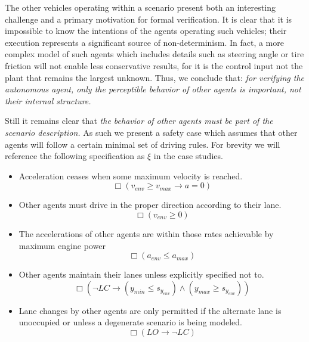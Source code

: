 \documentclass{easychair}
\theoremstyle{theorem}
\theoremstyle{remark}
\begin{document}
The other vehicles operating within a scenario present both an interesting challenge and a primary motivation for formal verification. It is clear that it is impossible to know the intentions of the agents operating such vehicles; their execution represents a significant source of non-determinism. In fact, a more complex model of such agents which includes details such as steering angle or tire friction will not enable less conservative results, for it is the control input not the plant that remains the largest unknown. Thus, we conclude that:
{\it for verifying the autonomous agent, only the perceptible behavior of other agents is important, not their internal structure.}



Still it remains clear that {\it the behavior of other agents must be part of the scenario description.} As such we present a safety case which assumes that other agents will follow a certain minimal set of driving rules. For brevity we will reference the following specification as $\xi$ in the case studies.%

\begin{itemize}
	\item Acceleration ceases when some maximum velocity is reached.
	\begin{equation}
	\Box \left( v_{env} \geq v_{max} \to a = 0 \right)
	\end{equation}
	\item Other agents must drive in the proper direction according to their lane.
	\begin{equation}
	\Box \left( v_{env} \geq 0 \right)
	\end{equation}
	\item The accelerations of other agents are within those rates achievable by maximum engine power
	\begin{equation}
	\Box \left( a_{env} \leq a_{max}\right)
	\end{equation}
	\item Other agents maintain their lanes unless explicitly specified not to.
	\begin{equation}
	\Box \left( \neg LC \to \left( y_{min} \leq s_{y_{env}} \right) \wedge \left( y_{max} \geq s_{y_{env}} \right) \right)
	\end{equation}
	\item Lane changes by other agents are only permitted if the alternate lane is unoccupied or unless a degenerate scenario is being modeled.
	\begin{equation}
	\Box \left( LO \to \neg LC \right)
	\end{equation}
	

	
\end{itemize}
\end{document}

